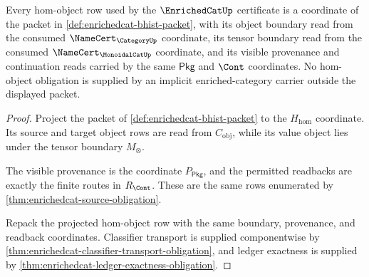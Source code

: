 \begin{theorem}\label{thm:enrichedcat-hom-object-carrier-obligation}
Every hom-object row used by the $\EnrichedCatUp$ certificate is a coordinate
of the packet in \autoref{def:enrichedcat-bhist-packet}, with its object
boundary read from the consumed $\NameCert_{\CategoryUp}$ coordinate, its
tensor boundary read from the consumed $\NameCert_{\MonoidalCatUp}$ coordinate,
and its visible provenance and continuation reads carried by the same
$\mathsf{Pkg}$ and $\Cont$ coordinates. No hom-object obligation is supplied by
an implicit enriched-category carrier outside the displayed packet.
\end{theorem}
\begin{proof}
Project the packet of \autoref{def:enrichedcat-bhist-packet} to the
$H_{\mathrm{hom}}$ coordinate. Its source and target object rows are read from
$C_{\mathrm{obj}}$, while its value object lies under the tensor boundary
$M_{\otimes}$.

The visible provenance is the coordinate $P_{\mathsf{Pkg}}$, and the permitted
readbacks are exactly the finite routes in $R_{\Cont}$. These are the same rows
enumerated by \autoref{thm:enrichedcat-source-obligation}.

Repack the projected hom-object row with the same boundary, provenance, and
readback coordinates. Classifier transport is supplied componentwise by
\autoref{thm:enrichedcat-classifier-transport-obligation}, and ledger exactness
is supplied by \autoref{thm:enrichedcat-ledger-exactness-obligation}.
\end{proof}

